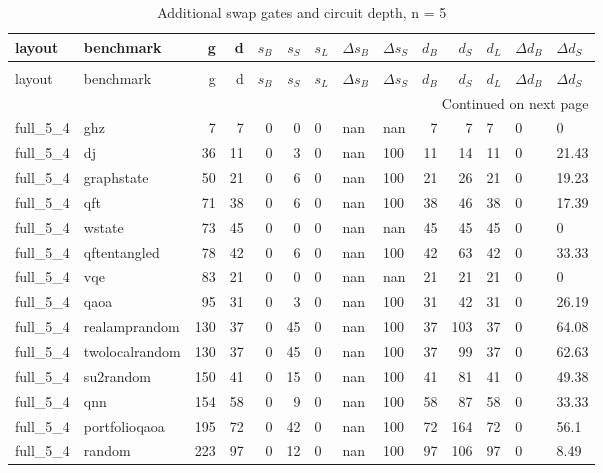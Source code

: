 \begin{longtable}{llrrrrlllrrlll}
\caption{Additional swap gates and circuit depth, n = 5} \label{benchmark-table-5} \\
\toprule
layout & benchmark & g & d & $s_B$ & $s_S$ & $s_L$ & $\Delta s_B$ & $\Delta s_S$ & $d_B$ & $d_S$ & $d_L$ & $\Delta d_B$ & $\Delta d_S$ \\
\midrule
\endfirsthead
\caption[]{Additional swap gates and circuit depth, n = 5} \\
\toprule
layout & benchmark & g & d & $s_B$ & $s_S$ & $s_L$ & $\Delta s_B$ & $\Delta s_S$ & $d_B$ & $d_S$ & $d_L$ & $\Delta d_B$ & $\Delta d_S$ \\
\midrule
\endhead
\midrule
\multicolumn{14}{r}{Continued on next page} \\
\midrule
\endfoot
\bottomrule
\endlastfoot
full\_5\_4 & ghz & 7 & 7 & 0 & 0 & 0 & nan & nan & 7 & 7 & 7 & 0 & 0 \\
full\_5\_4 & dj & 36 & 11 & 0 & 3 & 0 & nan & 100 & 11 & 14 & 11 & 0 & 21.43 \\
full\_5\_4 & graphstate & 50 & 21 & 0 & 6 & 0 & nan & 100 & 21 & 26 & 21 & 0 & 19.23 \\
full\_5\_4 & qft & 71 & 38 & 0 & 6 & 0 & nan & 100 & 38 & 46 & 38 & 0 & 17.39 \\
full\_5\_4 & wstate & 73 & 45 & 0 & 0 & 0 & nan & nan & 45 & 45 & 45 & 0 & 0 \\
full\_5\_4 & qftentangled & 78 & 42 & 0 & 6 & 0 & nan & 100 & 42 & 63 & 42 & 0 & 33.33 \\
full\_5\_4 & vqe & 83 & 21 & 0 & 0 & 0 & nan & nan & 21 & 21 & 21 & 0 & 0 \\
full\_5\_4 & qaoa & 95 & 31 & 0 & 3 & 0 & nan & 100 & 31 & 42 & 31 & 0 & 26.19 \\
full\_5\_4 & realamprandom & 130 & 37 & 0 & 45 & 0 & nan & 100 & 37 & 103 & 37 & 0 & 64.08 \\
full\_5\_4 & twolocalrandom & 130 & 37 & 0 & 45 & 0 & nan & 100 & 37 & 99 & 37 & 0 & 62.63 \\
full\_5\_4 & su2random & 150 & 41 & 0 & 15 & 0 & nan & 100 & 41 & 81 & 41 & 0 & 49.38 \\
full\_5\_4 & qnn & 154 & 58 & 0 & 9 & 0 & nan & 100 & 58 & 87 & 58 & 0 & 33.33 \\
full\_5\_4 & portfolioqaoa & 195 & 72 & 0 & 42 & 0 & nan & 100 & 72 & 164 & 72 & 0 & 56.1 \\
full\_5\_4 & random & 223 & 97 & 0 & 12 & 0 & nan & 100 & 97 & 106 & 97 & 0 & 8.49 \\

\end{longtable}
